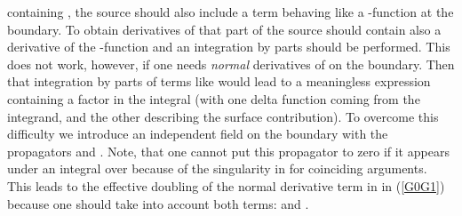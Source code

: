 \documentclass[a4paper,12pt]{article}
\begin{document}
containing \coordHE{}, the source \coordHE{} should also include a 
term behaving like a \myHighlight{$\delta$}\coordHE{}-function at the boundary. 
To obtain derivatives of
\myHighlight{$\xi$}\coordHE{} that part of 
the source should contain also a derivative of the
\myHighlight{$\delta$}\coordHE{}-function and an integration by parts should be performed.
This does not work, however, if one needs {\it normal}
derivatives of \myHighlight{$\xi$}\coordHE{} on the boundary. Then that integration
by parts of terms like \coordHE{}  would lead to
a meaningless expression containing a factor 
\coordHE{} in the integral 
(with one delta function coming from the integrand, and the other
describing the surface contribution). To overcome this difficulty we 
introduce an independent field 
\coordHE{} on 
the boundary with the propagators \coordHE{} and \coordHE{}. Note, that one cannot put this
propagator to zero if it appears under an integral over
\coordHE{} because of the singularity in \coordHE{} for coinciding
arguments. This leads to the effective doubling of the
normal derivative term in \coordHE{} in (\ref{G0G1}) because one
should take into account both terms: \coordHE{}
and \coordHE{}.
\end{document}
